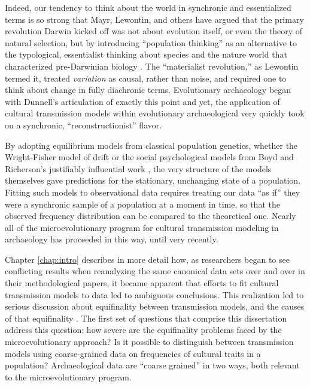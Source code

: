 Indeed, our tendency to think about the world in synchronic and essentialized terms is so strong that Mayr, Lewontin, and others have argued that the primary revolution Darwin kicked off was not about evolution itself, or even the theory of natural selection, but by introducing ``population thinking'' as an alternative to the typological, essentialist thinking about species and the nature world that characterized pre-Darwinian biology \citep{Dunnell1982,lewontin1974darwin,Mayr1959typological}.  The ``materialist revolution,'' as Lewontin termed it, treated \emph{variation} as causal, rather than noise, and required one to think about change in fully diachronic terms.  Evolutionary archaeology began with Dunnell's articulation of exactly this point \citep{Dunnell1978,Dunnell1980,Dunnell1982,Dunnell1989} and yet, the application of cultural transmission models within evolutionary archaeological very quickly took on a synchronic, ``reconstructionist'' flavor.  

By adopting equilibrium models from classical population genetics, whether the Wright-Fisher model of drift or the social psychological models from Boyd and Richerson's justifiably influential work \citeyearpar{BR1985}, the very structure of the models themselves gave predictions for the stationary, unchanging state of a population.  Fitting such models to observational data requires treating our data ``as if'' they were a synchronic sample of a population at a moment in time, so that the observed frequency distribution can be compared to the theoretical one.  Nearly all of the microevolutionary program for cultural  transmission modeling in archaeology has proceeded in this way, until very recently.  

Chapter \ref{chap:intro} describes in more detail how, as researchers began to see conflicting results when reanalyzing the same canonical data sets over and over in their methodological papers, it became apparent that efforts to fit cultural transmission models to data led to ambiguous conclusions.  This realization led to serious discussion about equifinality between transmission models, and the causes of that equifinality \citep{barrett2019equifinality,kandler2019analysing,premo2010equifinality}.  The first set of questions that comprise this dissertation address this question:  how severe are  the equifinality problems faced by the microevolutionary approach?  Is it possible to distinguish between transmission models using coarse-grained data on frequencies of cultural traits in a population?  Archaeological data are ``coarse grained'' in two ways, both relevant to the microevolutionary program. 

